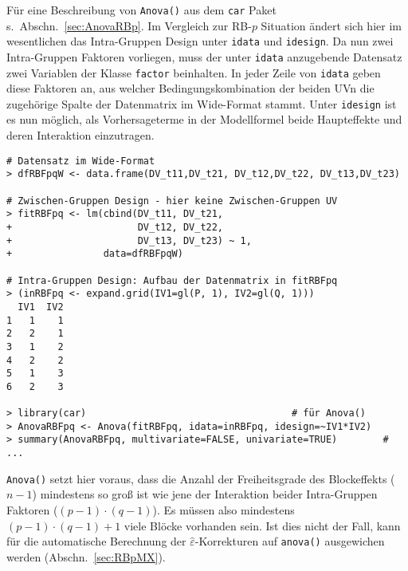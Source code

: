 Für eine Beschreibung von \lstinline!Anova()! aus dem \lstinline!car! Paket s.\ Abschn.\ \ref{sec:AnovaRBp}. Im Vergleich zur RB-$p$ Situation ändert sich hier im wesentlichen das Intra-Gruppen Design unter \lstinline!idata! und \lstinline!idesign!. Da nun zwei Intra-Gruppen Faktoren vorliegen, muss der unter \lstinline!idata! anzugebende Datensatz zwei Variablen der Klasse \lstinline!factor! beinhalten. In jeder Zeile von \lstinline!idata! geben diese Faktoren an, aus welcher Bedingungskombination der beiden UVn die zugehörige Spalte der Datenmatrix im Wide-Format stammt. Unter \lstinline!idesign! ist es nun möglich, als Vorhersageterme in der Modellformel beide Haupteffekte und deren Interaktion einzutragen.
\begin{lstlisting}
# Datensatz im Wide-Format
> dfRBFpqW <- data.frame(DV_t11,DV_t21, DV_t12,DV_t22, DV_t13,DV_t23)

# Zwischen-Gruppen Design - hier keine Zwischen-Gruppen UV
> fitRBFpq <- lm(cbind(DV_t11, DV_t21,
+                      DV_t12, DV_t22,
+                      DV_t13, DV_t23) ~ 1,
+                data=dfRBFpqW)

# Intra-Gruppen Design: Aufbau der Datenmatrix in fitRBFpq
> (inRBFpq <- expand.grid(IV1=gl(P, 1), IV2=gl(Q, 1)))
  IV1  IV2
1   1    1
2   2    1
3   1    2
4   2    2
5   1    3
6   2    3

> library(car)                                    # für Anova()
> AnovaRBFpq <- Anova(fitRBFpq, idata=inRBFpq, idesign=~IV1*IV2)
> summary(AnovaRBFpq, multivariate=FALSE, univariate=TRUE)        # ...
\end{lstlisting}

\lstinline!Anova()! setzt hier voraus, dass die Anzahl der Freiheitsgrade des Blockeffekts ($n-1$) mindestens so groß ist wie jene der Interaktion beider Intra-Gruppen Faktoren ($(p-1) \cdot (q-1)$). Es müssen also mindestens $(p-1) \cdot (q-1) + 1$ viele Blöcke vorhanden sein. Ist dies nicht der Fall, kann für die automatische Berechnung der $\hat{\varepsilon}$-Korrekturen auf \lstinline!anova()! ausgewichen werden (Abschn.\ \ref{sec:RBpMX}).


